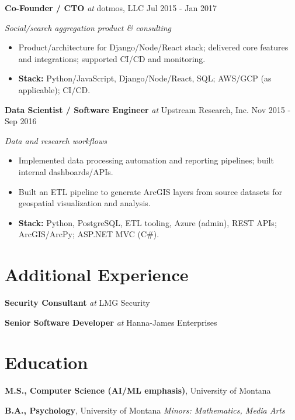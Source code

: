 \documentclass[10pt]{article}
\newcommand{\roleline}[4]{%
  \noindent\textbf{#1} \textit{at} #2 #3 \hfill #4\par
}
\begin{document}
\roleline{Co-Founder / CTO}{dotmos, LLC}{}{Jul 2015 - Jan 2017}
\emph{Social/search aggregation product \& consulting}\par
\begin{itemize}
  \item Product/architecture for Django/Node/React stack; delivered core features and integrations; supported CI/CD and monitoring.
  \item \textbf{Stack:} Python/JavaScript, Django/Node/React, SQL; AWS/GCP (as applicable); CI/CD.
\end{itemize}


\roleline{Data Scientist / Software Engineer}{Upstream Research, Inc.}{}{Nov 2015 - Sep 2016}
\emph{Data and research workflows}\par
\begin{itemize}
  \item Implemented data processing automation and reporting pipelines; built internal dashboards/APIs.
  \item Built an ETL pipeline to generate ArcGIS layers from source datasets for geospatial visualization and analysis.
  \item \textbf{Stack:} Python, PostgreSQL, ETL tooling, Azure (admin), REST APIs; ArcGIS/ArcPy; ASP.NET MVC (C\#).
\end{itemize}


\section*{Additional Experience}
\noindent\textbf{Security Consultant} \textit{at} LMG Security\par
\noindent\textbf{Senior Software Developer} \textit{at} Hanna-James Enterprises


\section*{Education}
\textbf{M.S., Computer Science (AI/ML emphasis)}, University of Montana\par
\textbf{B.A., Psychology}, University of Montana \quad \emph{Minors: Mathematics, Media Arts}


\end{document}
